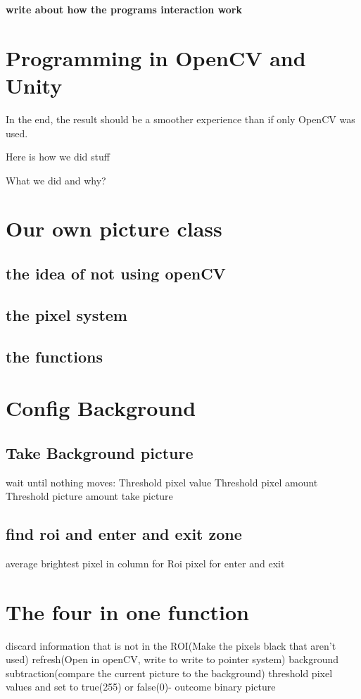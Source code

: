 \textbf{write about how the programs interaction work}
\section{Programming in OpenCV and Unity}

In the end, the result should be a smoother experience than if only OpenCV was used.

Here is how we did stuff

What we did and why?

\section{Our own picture class}
\subsection{the idea of not using openCV}
\subsection{the pixel system}
\subsection{the functions}

\section{Config Background}
\subsection{Take Background picture}
wait until nothing moves:
	Threshold pixel value
	Threshold pixel amount
	Threshold picture amount
take picture
\subsection{find roi and enter and exit zone}
average brightest pixel in column for Roi
pixel for enter and exit

\section{The four in one function}
discard information that is not in the ROI(Make the pixels black that aren't used)
refresh(Open in openCV, write to write to pointer system)
background subtraction(compare the current picture to the background)
threshold pixel values and set to true(255) or false(0)- outcome binary picture

